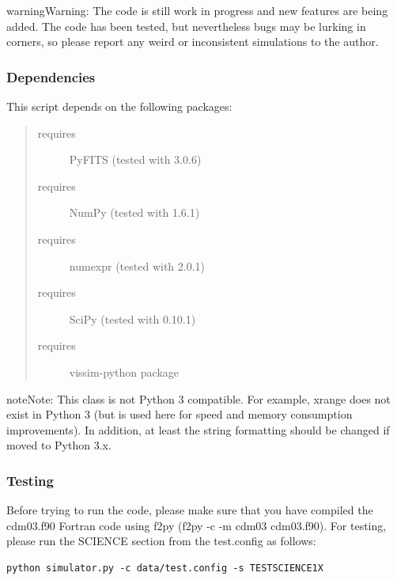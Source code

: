 \documentclass[a4paper,12pt,english]{sphinxmanual}
\begin{document}
\begin{notice}{warning}{Warning:}
The code is still work in progress and new features are being added.
The code has been tested, but nevertheless bugs may be lurking in corners, so
please report any weird or inconsistent simulations to the author.
\end{notice}


\subsubsection{Dependencies}
\label{simulator:dependencies}
This script depends on the following packages:
\begin{quote}\begin{description}
\item[{requires}] \leavevmode
PyFITS (tested with 3.0.6)

\item[{requires}] \leavevmode
NumPy (tested with 1.6.1)

\item[{requires}] \leavevmode
numexpr (tested with 2.0.1)

\item[{requires}] \leavevmode
SciPy (tested with 0.10.1)

\item[{requires}] \leavevmode
vissim-python package

\end{description}\end{quote}

\begin{notice}{note}{Note:}
This class is not Python 3 compatible. For example, xrange does not exist
in Python 3 (but is used here for speed and memory consumption improvements).
In addition, at least the string formatting should be changed if moved to
Python 3.x.
\end{notice}


\subsubsection{Testing}
\label{simulator:testing}
Before trying to run the code, please make sure that you have compiled the
cdm03.f90 Fortran code using f2py (f2py -c -m cdm03 cdm03.f90). For testing,
please run the SCIENCE section from the test.config as follows:

\begin{Verbatim}[commandchars=\\\{\}]
python simulator.py -c data/test.config -s TESTSCIENCE1X
\end{Verbatim}
\end{document}
